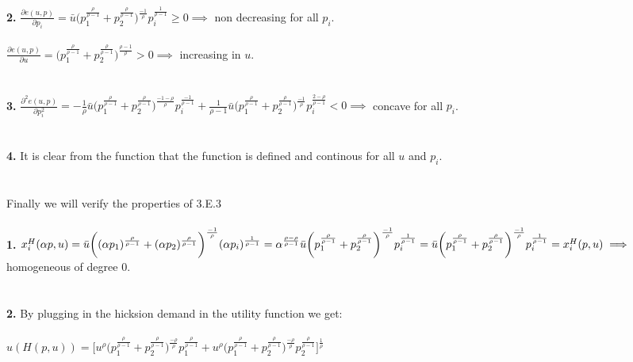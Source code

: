 \documentclass[12pt]{article}
\newenvironment{problem}[2][Problem]{\begin{trivlist}
\item[\hskip \labelsep {\bfseries #1}\hskip \labelsep {\bfseries #2.}]}{\end{trivlist}}
\newcommand\ddfrac[2]{\frac{\displaystyle #1}{\displaystyle #2}}
\begin{document}
\begin{problem}{4}
\\
\\
\textbf{2.} $\ddfrac{\partial e(u, p)}{\partial p_i} = \bar{u} \bigg(p_1^{\frac{\rho}{\rho-1}} + p_2^{\frac{\rho}{\rho-1}}\bigg)^\frac{ - 1}{\rho} p_i^\frac{  1}{\rho-1} \geq 0 \implies $ non decreasing for all $p_i$. 
\\
\\
$\ddfrac{\partial e(u, p)}{\partial u} =  \bigg(p_1^{\frac{\rho}{\rho-1}} + p_2^{\frac{\rho}{\rho-1}}\bigg)^\frac{ \rho - 1}{\rho}  > 0 \implies $ increasing in $ u. $
\\
\\
\\
\textbf{3.} $\ddfrac{\partial^2 e(u, p)}{\partial p_i^2} = - \frac{1}{\rho}\bar{u} \bigg(p_1^{\frac{\rho}{\rho-1}} + p_2^{\frac{\rho}{\rho-1}}\bigg)^\frac{ - 1 - \rho}{\rho} p_i^\frac{ - 1}{\rho-1} + \frac{1}{\rho - 1}\bar{u} \bigg(p_1^{\frac{\rho}{\rho-1}} + p_2^{\frac{\rho}{\rho-1}}\bigg)^\frac{ - 1 }{\rho} p_i^\frac{ 2 - \rho}{\rho-1}  < 0 \implies $ concave for all $p_i$. 
\\
\\
\\
\textbf{4.} It is clear from the function that the function is defined and continous for all $u$ and $ p_i$. 
\\
\\
\\
Finally we will verify the properties of 3.E.3
\\
\\
\textbf{1.} $x_i^H(\alpha p, u) = \bar{u} \bigg((\alpha p_1)^{\frac{\rho}{\rho-1}} + (\alpha p_2)^{\frac{\rho}{\rho-1}}\bigg)^\frac{ - 1}{\rho} ( \alpha p_i)^\frac{ 1}{\rho-1} \\
\\
= \alpha^{\frac{\rho - \rho}{\rho -1 }}\bar{u} \bigg(p_1^{\frac{\rho}{\rho-1}} + p_2^{\frac{\rho}{\rho-1}}\bigg)^\frac{ - 1}{\rho}  p_i^\frac{ 1}{\rho-1} = \bar{u} \bigg(p_1^{\frac{\rho}{\rho-1}} + p_2^{\frac{\rho}{\rho-1}}\bigg)^\frac{ - 1}{\rho}  p_i^\frac{ 1}{\rho-1} =  x_i^H(p, u) \implies $  homogeneous of degree 0. 
\\
\\
\\
\textbf{2.} By plugging in the hicksion demand in the utility function we get:
\\
\\
$u(H(p, u)) = \Bigg[ u^\rho \bigg(p_1^{\frac{\rho}{\rho-1}} + p_2^{\frac{\rho}{\rho-1}}\bigg)^\frac{ - \rho}{\rho} p_1^\frac{ \rho}{\rho-1} + u^\rho \bigg(p_1^{\frac{\rho}{\rho-1}} + p_2^{\frac{\rho}{\rho-1}}\bigg)^\frac{ - \rho}{\rho} p_2^\frac{ \rho}{\rho-1} \Bigg]^\frac{1}{\rho}$  

\end{problem}
\end{document}
